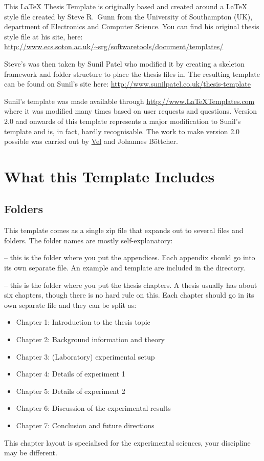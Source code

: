 \documentclass[
12pt, %
english, %
doublespacing, %
nolistspacing, %
liststotoc, %
headsepline, %
chapterinoneline, %
openany, %
]{DoctoralThesis}\usepackage[]{graphicx}\usepackage[]{color}
\begin{document}
This \LaTeX{} Thesis Template is originally based and created around a \LaTeX{} style file created by Steve R.\ Gunn from the University of Southampton (UK), department of Electronics and Computer Science. You can find his original thesis style file at his site, here:
\url{http://www.ecs.soton.ac.uk/~srg/softwaretools/document/templates/}

Steve's  was then taken by Sunil Patel who modified it by creating a skeleton framework and folder structure to place the thesis files in. The resulting template can be found on Sunil's site here:
\url{http://www.sunilpatel.co.uk/thesis-template}

Sunil's template was made available through \url{http://www.LaTeXTemplates.com} where it was modified many times based on user requests and questions. Version 2.0 and onwards of this template represents a major modification to Sunil's template and is, in fact, hardly recognisable. The work to make version 2.0 possible was carried out by \href{mailto:vel@latextemplates.com}{Vel} and Johannes Böttcher.


\section{What this Template Includes}

\subsection{Folders}

This template comes as a single zip file that expands out to several files and folders. The folder names are mostly self-explanatory:

 -- this is the folder where you put the appendices. Each appendix should go into its own separate  file. An example and template are included in the directory.

 -- this is the folder where you put the thesis chapters. A thesis usually has about six chapters, though there is no hard rule on this. Each chapter should go in its own separate  file and they can be split as:
\begin{itemize}
\item Chapter 1: Introduction to the thesis topic
\item Chapter 2: Background information and theory
\item Chapter 3: (Laboratory) experimental setup
\item Chapter 4: Details of experiment 1
\item Chapter 5: Details of experiment 2
\item Chapter 6: Discussion of the experimental results
\item Chapter 7: Conclusion and future directions
\end{itemize}
This chapter layout is specialised for the experimental sciences, your discipline may be different.
\end{document}
